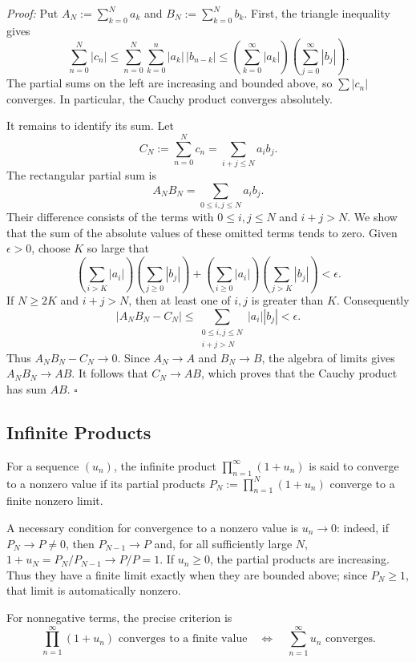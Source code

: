 \documentclass[a4paper,11pt,abstracton]{scrartcl}
\theoremstyle{dotlessP}
\theoremstyle{dotlessS}
\theoremstyle{remark}
\theoremstyle{definition}
\begin{document}
\begin{claim_box}
\textit{Proof:}
Put $A_N:=\sum_{k=0}^N a_k$ and $B_N:=\sum_{k=0}^N b_k$.
First, the triangle inequality gives
\[
 \sum_{n=0}^N|c_n|
 \le\sum_{n=0}^N\sum_{k=0}^n|a_k|\,|b_{n-k}|
 \le\left(\sum_{k=0}^{\infty}|a_k|\right)
      \left(\sum_{j=0}^{\infty}|b_j|\right).
\]
The partial sums on the left are increasing and bounded above, so
$\sum|c_n|$ converges. In particular, the Cauchy product converges
absolutely.

It remains to identify its sum. Let
\[
 C_N:=\sum_{n=0}^N c_n
     =\sum_{i+j\le N}a_i b_j.
\]
The rectangular partial sum is
\[
 A_NB_N=\sum_{0\le i,j\le N}a_i b_j.
\]
Their difference consists of the terms with $0\le i,j\le N$ and
$i+j>N$. We show that the sum of the absolute values of these omitted
terms tends to zero. Given $\epsilon>0$, choose $K$ so large that
\[
 \left(\sum_{i>K}|a_i|\right)\left(\sum_{j\ge0}|b_j|\right)
 +\left(\sum_{i\ge0}|a_i|\right)
  \left(\sum_{j>K}|b_j|\right)<\epsilon.
\]
If $N\ge2K$ and $i+j>N$, then at least one of $i,j$ is greater
than $K$. Consequently
\[
 |A_NB_N-C_N|
 \le\sum_{\substack{0\le i,j\le N\\i+j>N}}|a_i||b_j|
 <\epsilon.
\]
Thus $A_NB_N-C_N\to0$. Since $A_N\to A$ and $B_N\to B$,
the algebra of limits gives $A_NB_N\to AB$. It follows that
$C_N\to AB$, which proves that the Cauchy product has sum $AB$.
\hfill$\square$
\end{claim_box}

\subsection{Infinite Products}

\begin{definition_box}
For a sequence $(u_n)$, the infinite product
$\prod_{n=1}^{\infty}(1+u_n)$ is said to converge to a nonzero value
if its partial products
$P_N:=\prod_{n=1}^N(1+u_n)$ converge to a finite nonzero limit.
\end{definition_box}

A necessary condition for convergence to a nonzero value is $u_n\to0$:
indeed, if $P_N\to P\ne0$, then $P_{N-1}\to P$ and, for all
sufficiently large $N$,
$1+u_N=P_N/P_{N-1}\to P/P=1$.
If $u_n\ge0$, the partial products are increasing. Thus they have a
finite limit exactly when they are bounded above; since $P_N\ge1$,
that limit is automatically nonzero.

For nonnegative terms, the precise criterion is
\[
    \prod_{n=1}^{\infty}(1+u_n)\text{ converges to a finite value}
    \quad\Longleftrightarrow\quad
    \sum_{n=1}^{\infty}u_n\text{ converges}.
\]
\end{document}

